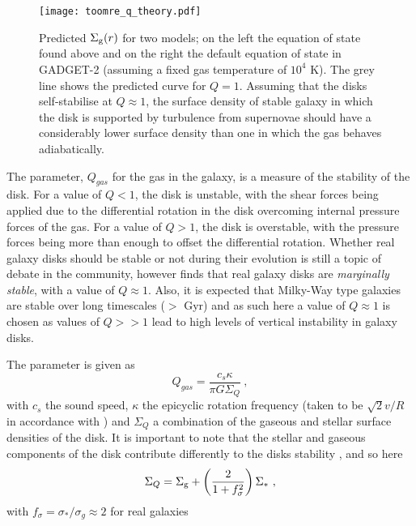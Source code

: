 \begin{figure}
    \centering
    \texttt{[image: toomre\_q\_theory.pdf]}
    \caption{Predicted $\Sigma_\mathrm{g}(r)$ for two models; on the left the equation of state found above and on the right the default equation of state in GADGET-2 (assuming a fixed gas temperature of $10^4$ K). The grey line shows the predicted curve for $Q=1$. Assuming that the disks self-stabilise at $Q\approx1$, the surface density of stable galaxy in which the disk is supported by turbulence from supernovae should have a considerably lower surface density than one in which the gas behaves adiabatically.}
    \label{fig:toomreqthr}
\end{figure}

The \citet{toomre_gravitational_1964} parameter, $Q_{gas}$ for the gas in the galaxy, is a measure of the stability of the disk.
For a value of $Q<1$, the disk is unstable, with the shear forces being applied due to the differential rotation in the disk overcoming internal pressure forces of the gas.
For a value of $Q>1$, the disk is overstable, with the pressure forces being more than enough to offset the differential rotation.
Whether real galaxy disks should be stable or not during their evolution is still a topic of debate in the community, however \citet{hopkins_stellar_2012} finds that real galaxy disks are \emph{marginally stable}, with a value of $Q \approx 1$.
Also, it is expected that Milky-Way type galaxies are stable over long timescales ($>$ Gyr) and as such here a value of $Q \approx 1$ is chosen as values of $Q >> 1$ lead to high levels of vertical instability in galaxy disks.

The \citet{toomre_gravitational_1964} parameter is given as
\begin{equation}
    Q_{gas} = \frac{c_s \kappa}{\pi G \Sigma_Q}~,
    \label{eqn:Q}
\end{equation}
with $c_s$ the sound speed, $\kappa$ the epicyclic rotation frequency (taken to be $\sqrt{2} v/R$ in accordance with \citet{livermore_resolved_2015}) and $\Sigma_Q$ a combination of the gaseous and stellar surface densities of the disk.
It is important to note that the stellar and gaseous components of the disk contribute differently to the disks stability \citep{rafikov_local_2001}, and so here
\begin{equation}
    \Sigma_Q = \Sigma_\mathrm{g}  + \left(\frac{2}{1 + f_\sigma^2}\right)\Sigma_*~,
    \label{eqn:sgq}
\end{equation}
with $f_\sigma = \sigma_*/\sigma_g \approx 2$ for real galaxies \citep{korchagin_local_2003}

